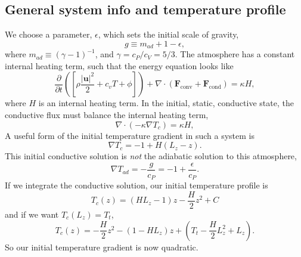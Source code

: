 \documentclass[aps, pre, onecolumn, nofootinbib, notitlepage, groupedaddress, amsfonts, amssymb, amsmath, longbibliography]{revtex4-1}
\newcommand{\grad}{\ensuremath{\nabla}}
\begin{document}
\subsection{General system info and temperature profile}
We choose a parameter, $\epsilon$, which sets the initial scale of gravity,
\begin{equation}
g \equiv m_{ad} + 1 - \epsilon,
\end{equation}
where $m_{ad} \equiv (\gamma - 1)^{-1}$, and $\gamma = c_P / c_V = 5/3$.  The atmosphere
has a constant internal heating term, such that the energy equation looks like
\begin{equation}
\frac{\partial}{\partial t}\left(\left[\rho\frac{|\bm{u}|^2}{2} + c_v T + \phi\right]\right)
+ \grad\cdot\left(\bm{F}_{\text{conv}} + \bm{F}_{\text{cond}}\right) = \kappa H,
\end{equation}
where $H$ is an internal heating term.  In the initial, static, conductive state, the
conductive flux must balance the internal heating term,
\begin{equation}
\grad\cdot\left(-\kappa\grad T_{c}\right) = \kappa H,
\end{equation}
A useful form of the initial temperature gradient in such a system is
\begin{equation}
\grad T_{c} = - 1 + H (L_z - z).
\end{equation}
This initial conductive solution is \emph{not} the adiabatic solution to this atmosphere,
\begin{equation}
\grad T_{ad} = -\frac{g}{c_P} = -1 + \frac{\epsilon}{c_P}.
\end{equation}
If we integrate the conductive solution, our initial temperature profile is
$$
T_c(z) = (H L_z - 1) z - \frac{H}{2}z^2 + C
$$
and if we want $T_c(L_z) = T_t$,
\begin{equation}
T_c(z) = -\frac{H}{2}z^2 - (1 - H L_z) z + \left(T_t - \frac{H}{2}L_z^2 + L_z\right).
\end{equation}
So our initial temperature gradient is now quadratic.
\end{document}
